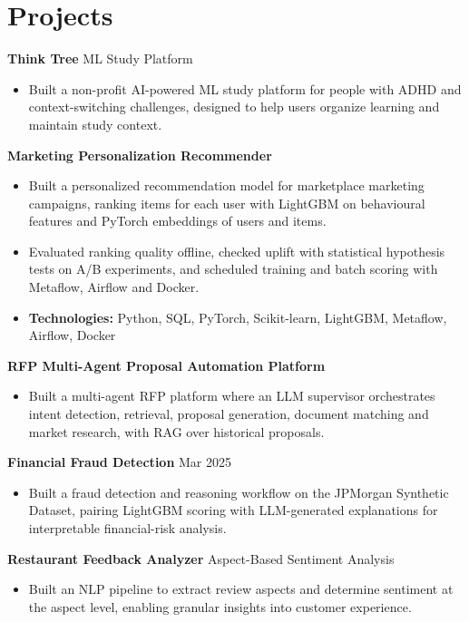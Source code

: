 \documentclass[10pt,a4paper]{article}
\begin{document}
\section{Projects}
\textbf{Think Tree} \textbar{} ML Study Platform\par
\begin{itemize}
  \item Built a non-profit AI-powered ML study platform for people with ADHD and context-switching challenges, designed to help users organize learning and maintain study context.
\end{itemize}
\textbf{Marketing Personalization Recommender}\par
\begin{itemize}
  \item Built a personalized recommendation model for marketplace marketing campaigns, ranking items for each user with LightGBM on behavioural features and PyTorch embeddings of users and items.
  \item Evaluated ranking quality offline, checked uplift with statistical hypothesis tests on A/B experiments, and scheduled training and batch scoring with Metaflow, Airflow and Docker.
  \item \textbf{Technologies:} Python, SQL, PyTorch, Scikit-learn, LightGBM, Metaflow, Airflow, Docker
\end{itemize}
\textbf{RFP Multi-Agent Proposal Automation Platform}\par
\begin{itemize}
  \item Built a multi-agent RFP platform where an LLM supervisor orchestrates intent detection, retrieval, proposal generation, document matching and market research, with RAG over historical proposals.
\end{itemize}
\textbf{Financial Fraud Detection} \textbar{} Mar 2025\par
\begin{itemize}
  \item Built a fraud detection and reasoning workflow on the JPMorgan Synthetic Dataset, pairing LightGBM scoring with LLM-generated explanations for interpretable financial-risk analysis.
\end{itemize}
\textbf{Restaurant Feedback Analyzer} \textbar{} Aspect-Based Sentiment Analysis\par
\begin{itemize}
  \item Built an NLP pipeline to extract review aspects and determine sentiment at the aspect level, enabling granular insights into customer experience.
\end{itemize}
\end{document}

